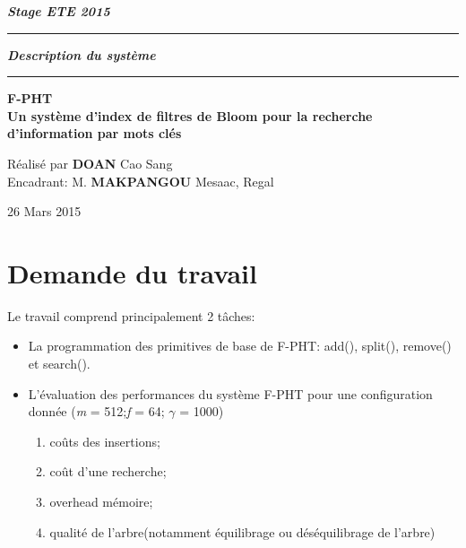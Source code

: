 \documentclass[a4paper,11pt]{report}
\begin{document}
	\begin{titlepage}
		\begin{center}
			\large\bfseries\itshape Stage ETE 2015\\
		\end{center}
		\noindent\rule{\linewidth}{3pt}

		\begin{center}
			\Huge\bfseries\itshape Description du système\\
		\end{center}
		
		\noindent\rule{\linewidth}{3pt}
		\begin{center}
			\bfseries
			\large F-PHT \\
			\large Un système d'index de filtres de Bloom pour la recherche d'information par mots clés
		\end{center}
		\begin{center}
			Réalisé par \textbf{DOAN} Cao Sang \\
			Encadrant: M. \textbf{MAKPANGOU} Mesaac, Regal
		\end{center}
		\begin{center}
			26 Mars 2015
		\end{center}
	\end{titlepage}

\tableofcontents

\chapter{Demande du travail}
Le travail comprend principalement 2 tâches:
\begin{itemize}
	\item La programmation des primitives de base de F-PHT: add(), split(), remove() et search().
	\item L'évaluation des performances du système F-PHT pour une configuration donnée (\textit{m} = 512;\textit{f} = 64; $\gamma$ = 1000)
			\begin{enumerate}
				\item coûts des insertions;
				\item coût d'une recherche;
				\item overhead mémoire;
				\item qualité de l'arbre(notamment équilibrage ou déséquilibrage de l'arbre)
			\end{enumerate}
\end{itemize}
\end{document}

